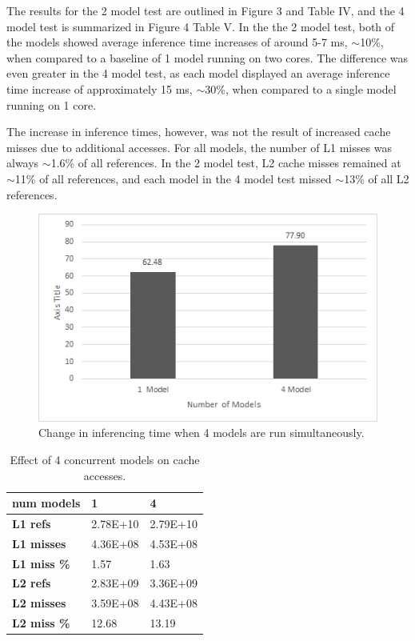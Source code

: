 The results for the 2 model test are outlined in Figure 3 and Table IV, and the 4 model test is summarized in 
Figure 4 Table V. In the the 2 model test, both of the models showed average inference time increases of around 
5-7 ms, $\sim$10\%, when compared to a baseline of 1 model running on two cores. The difference was even 
greater in the 4 model test, as each model displayed an average inference time increase of 
approximately 15 ms, $\sim$30\%, when compared to a single model running on 1 core.

The increase in inference times, however, was not the result of increased cache misses due to 
additional accesses. For all models, the number of L1 misses was always $\sim$1.6\% of all 
references. In the 2 model test, L2 cache misses remained at $\sim$11\% of all references, and each 
model in the 4 model test missed $\sim$13\% of all L2 references.

\begin{figure}[h]
  \centering
  \includegraphics[width=.5\textwidth]{figs/4ModelChart}
  \caption{Change in inferencing time when 4 models are run simultaneously. }
\end{figure}


\begin{table}[h]
\centering
  \begin{tabular} {| l | l | l |}
  \hline
  \textbf{num models} & 1 & 4 \\  \hline
  \textbf{L1 refs} & 2.78E+10 & 2.79E+10 \\ \hline
  \textbf{L1 misses} & 4.36E+08 & 4.53E+08 \\ \hline
  \textbf{L1 miss \%} & 1.57 & 1.63 \\ \hline
  \textbf{L2 refs} & 2.83E+09 & 3.36E+09 \\ \hline 
  \textbf{L2 misses} & 3.59E+08 & 4.43E+08 \\ \hline
  \textbf{L2 miss \%} & 12.68 & 13.19 \\ 
\hline
  \end{tabular}
  \caption{ Effect of 4 concurrent models on cache accesses. }
\end{table}

